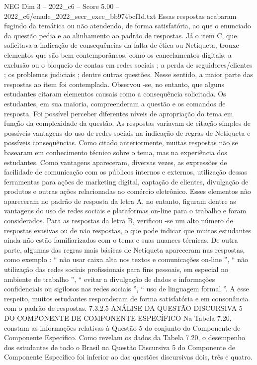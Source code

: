 \begin{textsample}{NEG Dim 3 – 2022\_c6 – Score 5.00 – 2022\_c6/enade\_2022\_secr\_exec\_bb974bcf1d.txt}
Essas respostas acabaram fugindo da temática ou não atendendo, de forma satisfatória, ao que o enunciado da questão pedia e ao alinhamento ao padrão de respostas.
Já o item C, que solicitava a indicação de consequências da falta de ética ou Netiqueta, trouxe elementos que são bem contemporâneos, como os cancelamentos digitais, a exclusão ou o bloqueio de contas em redes sociais ; a perda de seguidores/clientes ; os problemas judiciais ; dentre outras questões.
Nesse sentido, a maior parte das respostas ao item foi contemplada.
Observou -se, no entanto, que alguns estudantes citaram elementos causais como a consequência solicitada.
Os estudantes, em sua maioria, compreenderam a questão e os comandos de resposta.
Foi possível perceber diferentes níveis de apropriação do tema em função da complexidade da questão.
As respostas variavam de citação simples de possíveis vantagens do uso de redes sociais na indicação de regras de Netiqueta e possíveis consequências.
Como citado anteriormente, muitas respostas não se basearam em conhecimento técnico sobre o tema, mas na experiência dos estudantes.
Como vantagens apareceram, diversas vezes, as expressões de facilidade de comunicação com os públicos internos e externos, utilização dessas ferramentas para ações de marketing digital, captação de clientes, divulgação de produtos e outras ações relacionadas ao comércio eletrônico.
Esses elementos não apareceram no padrão de resposta da letra A, no entanto, figuram dentre as vantagens do uso de redes sociais e plataformas on-line para o trabalho e foram considerados.
Para as respostas da letra B, verificou -se um alto número de respostas evasivas ou de não respostas, o que pode indicar que muitos estudantes ainda não estão familiarizados com o tema e suas nuances técnicas.
De outra parte, algumas das regras mais básicas de Netiqueta apareceram nas respostas, como exemplo : “ não usar caixa alta nos textos e comunicações on-line ”, “ não utilização das redes sociais profissionais para fins pessoais, em especial no ambiente de trabalho ”, “ evitar a divulgação de dados e informações confidenciais ou sigilosos nas redes sociais ”, “ uso de linguagem formal ”.
A esse respeito, muitos estudantes responderam de forma satisfatória e em consonância com o padrão de respostas. 7.3.2.5 ANÁLISE DA QUESTÃO DISCURSIVA 5 DO COMPONENTE DE COMPONENTE ESPECÍFICO Na Tabela 7.20, constam as informações relativas à Questão 5 do conjunto do Componente de Componente Específico.
Como revelam os dados da Tabela 7.20, o desempenho dos estudantes de todo o Brasil na Questão Discursiva 5 do Componente de Componente Específico foi inferior ao das questões discursivas dois, três e quatro.

\end{textsample}
